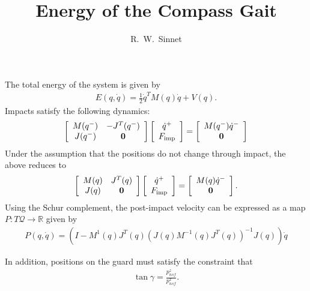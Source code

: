 \documentclass{article}
\author{R.~W.~Sinnet}
\title{Energy of the Compass Gait}
\newcommand{\R}{\mathbb{R}}
\newcommand{\Q}{\mathcal{Q}}
\begin{document}
\maketitle

The total energy of the system is given by
\begin{align*}
  E(q, \dot q) = \frac{1}{2} {\dot q}^{T} M(q) {\dot q} + V(q).
\end{align*}
%
Impacts satisfy the following dynamics:
%
\begin{align*}
  \left[\begin{array}{c c}
      M(q^{-}) & -J^{T}(q^{-})\\
      J(q^{-}) & \mathbf{0}
    \end{array}\right]
  \left[\begin{array}{c}
      {\dot q}^{+}\\
      F_{\mathrm{imp}}
    \end{array}\right]
  = \left[\begin{array}{c}
      M(q^{-}) {\dot q}^{-}\\
      \mathbf{0}
      \end{array}\right]
\end{align*}
%
Under the assumption that the positions do not change through impact, the above reduces to
%
\begin{align*}
  \left[\begin{array}{c c}
      M(q) & J^{T}(q)\\
      J(q) & \mathbf{0}
    \end{array}\right]
  \left[\begin{array}{c}
      {\dot q^{+}}\\
      F_{\mathrm{imp}}
    \end{array}\right]
  = \left[\begin{array}{c}
      M(q) {\dot q}^{-}\\
      \mathbf{0}
    \end{array}\right].
\end{align*}
%
Using the Schur complement, the post-impact velocity can be expressed as a map $P : T\Q \to \R$ given by
\begin{align}
  \label{eq:reset-map}
  P(q, {\dot q}) = \left( I - M^{1}(q) J^{T}(q) \left( J(q) M^{-1}(q) J^{T}(q) \right)^{-1} J(q) \right) {\dot q}
\end{align}

In addition, positions on the guard must satisfy the constraint that
\begin{align}
  \label{eq:guard-constraint}
  \tan \gamma = \frac{p_{\mathit{nsf}}^{z}}{p_{\mathit{nsf}}^{x}}.
\end{align}
\end{document}

